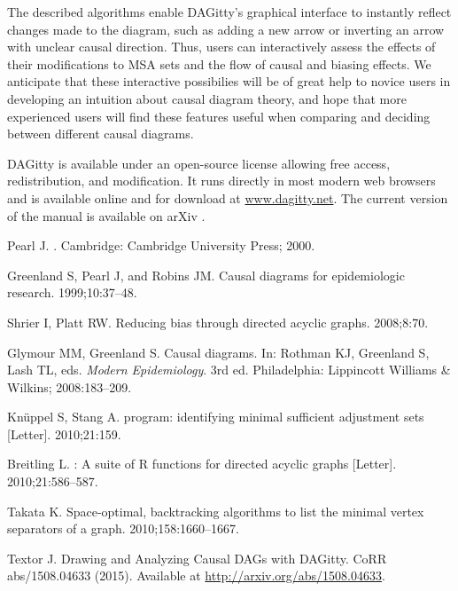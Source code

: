 \documentclass[12pt,letterpaper]{article}
\begin{document}
The described algorithms enable DAGitty's graphical interface to instantly reflect
changes made to the diagram, such as adding a new arrow or inverting an arrow 
with unclear causal direction. Thus, users can interactively assess the effects 
of their modifications to MSA sets and the flow of causal and biasing effects. We anticipate
that these interactive possibilies will be of great help to novice users
in developing an intuition about causal diagram theory, and hope that more
experienced users will find these features useful when comparing 
and deciding between different causal diagrams. 

DAGitty is available under an open-source license allowing free
access, redistribution, and modification. It runs directly in 
most modern web browsers and is available online and for 
download at \url{www.dagitty.net}. The current version of the 
manual is available on arXiv \cite{Textor2015}.

%

\begin{thebibliography}{1}

Pearl J. 
.
\newblock Cambridge: Cambridge University Press; 2000.

Greenland S, Pearl J, and Robins JM.
\newblock Causal diagrams for epidemiologic research.
 1999;10:37--48.

Shrier I, Platt RW.
\newblock Reducing bias through directed acyclic graphs.
 2008;8:70.

Glymour MM, Greenland S.
\newblock Causal diagrams.
\newblock In: Rothman KJ, Greenland S, Lash TL, eds. {\em Modern Epidemiology}.
3rd ed. 
\newblock Philadelphia: Lippincott Williams \& Wilkins; 2008:183--209.

Kn\"uppel S, Stang A.
 program: identifying minimal sufficient adjustment sets [Letter]. 
 2010;21:159.

Breitling L.
: A suite of {R} functions for directed acyclic graphs [Letter].
 2010;21:586--587.

Takata K.
\newblock Space-optimal, backtracking algorithms to list the minimal vertex
  separators of a graph.
 2010;158:1660--1667.


Textor J.
\newblock
Drawing and Analyzing Causal DAGs with DAGitty.
\newblock CoRR abs/1508.04633 (2015). Available at
\url{http://arxiv.org/abs/1508.04633}.


\end{thebibliography}
\end{document}
